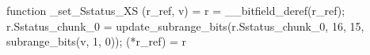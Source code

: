 function _set_Sstatus_XS (r_ref, v) = {
    r = __bitfield_deref(r_ref);
    r.Sstatus_chunk_0 = update_subrange_bits(r.Sstatus_chunk_0, 16, 15, subrange_bits(v, 1, 0));
    (*r_ref) = r
}
